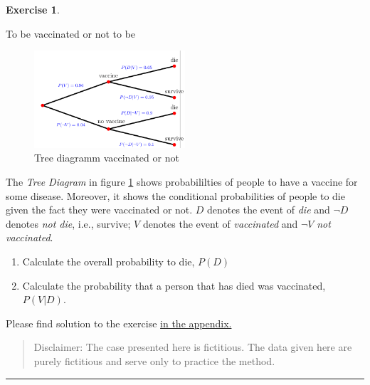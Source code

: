 \documentclass[
  12pt,
  oneside]{book}
\providecommand{\tightlist}{%
  \setlength{\itemsep}{0pt}\setlength{\parskip}{0pt}}
\theoremstyle{definition}
\theoremstyle{definition}
\theoremstyle{definition}
\newtheorem{exercise}{Exercise}[chapter]
\theoremstyle{definition}
\theoremstyle{remark}
\begin{document}
\begin{exercise}
\protect\hypertarget{exr:tobevacornot}{}\label{exr:tobevacornot}

To be vaccinated or not to be

\begin{figure}
\centering
\includegraphics[width=0.5\textwidth,height=\textheight]{fig/diesurvive.png}
\caption{\label{fig:diesurvive} Tree diagramm vaccinated or not}
\end{figure}

The \emph{Tree Diagram} in figure \ref{fig:diesurvive} shows probabililties of people to have a vaccine for some disease. Moreover, it shows the conditional probabilities of people to die given the fact they were vaccinated or not.
\(D\) denotes the event of \emph{die} and \(\neg D\) denotes \emph{not die}, i.e., survive; \(V\) denotes the event of \emph{vaccinated} and \(\neg V\) \emph{not vaccinated}.

\begin{enumerate}
\def\labelenumi{\alph{enumi})}
\tightlist
\item
  Calculate the overall probability to die, \(P(D)\)
\item
  Calculate the probability that a person that has died was vaccinated, \(P(V|D)\).
\end{enumerate}

Please find solution to the exercise \hyperref[sol:tobevacornot]{in the appendix.}

\begin{quote}
Disclaimer: The case presented here is fictitious. The data given here are purely fictitious and serve only to practice the method.
\end{quote}

\begin{center}\rule{0.5\linewidth}{0.5pt}\end{center}

\end{exercise}
\end{document}
